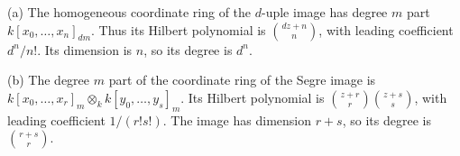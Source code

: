 (a) The homogeneous coordinate ring of the $d$-uple image has degree $m$ part $k[x_0,\ldots,x_n]_{dm}$. Thus its Hilbert polynomial is $\binom{dz+n}{n}$, with leading coefficient $d^n/n!$. Its dimension is $n$, so its degree is $d^n$.

(b) The degree $m$ part of the coordinate ring of the Segre image is $k[x_0,\ldots,x_r]_m\otimes_k k[y_0,\ldots,y_s]_m$. Its Hilbert polynomial is $\binom{z+r}{r}\binom{z+s}{s}$, with leading coefficient $1/(r!s!)$. The image has dimension $r+s$, so its degree is $\binom{r+s}{r}$.

